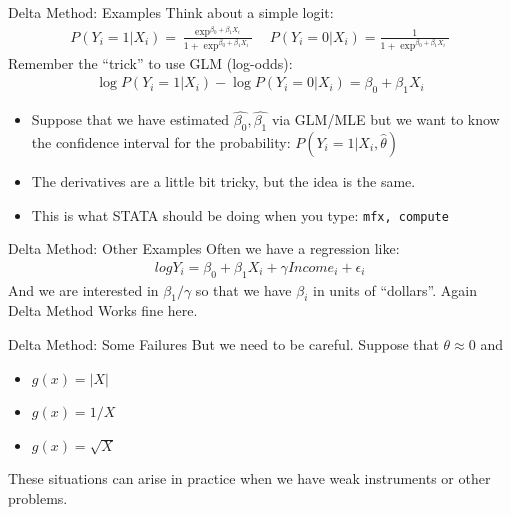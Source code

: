 \documentclass[aspectratio=169]{beamer}
\begin{document}
\begin{frame}{Delta Method: Examples}
Think about a simple logit:
\begin{eqnarray*}
P(Y_i=1 | X_i ) = \frac{\exp^{\beta_0 + \beta_1 X_i}}{1+\exp^{\beta_0 + \beta_1 X_i}}  \quad P(Y_i=0 | X_i ) = \frac{1}{1+\exp^{\beta_0 + \beta_1 X_i}} 
\end{eqnarray*}
Remember the ``trick'' to use GLM (log-odds):
\begin{eqnarray*}
\log P(Y_i=1 | X_i) - \log P(Y_i=0 | X_i) = \beta_0 + \beta_1 X_i
\end{eqnarray*}
\begin{itemize}
\item Suppose that we have estimated $\hat{\beta_0},\hat{\beta_1}$ via GLM/MLE but we want to know the confidence interval for the probability: $P(Y_i=1 | X_i,\hat{\theta})$
\item The derivatives are a little bit tricky, but the idea is the same.
\item This is what STATA should be doing when you type: \tt{mfx, compute}
\end{itemize}
\end{frame}

\begin{frame}{Delta Method: Other Examples}
Often we have a regression like:
\begin{eqnarray*}
log Y_i = \beta_0 + \beta_1 X_i + \gamma Income_i + \epsilon_i
\end{eqnarray*}
And we are interested in $\beta_1 / \gamma$ so that we have $\beta_i$ in units of ``dollars''. Again Delta Method Works fine here.\\
\end{frame}


\begin{frame}{Delta Method: Some Failures}
But we need to be careful.  Suppose that $\theta \approx 0$ and 
\begin{itemize}
\item $g(x)  = |X|$
\item $g(x)  = 1/X$
\item $g(x)  = \sqrt{X}$
\end{itemize}
These situations can arise in practice when we have weak instruments or other problems.
\end{frame}
\end{document}
